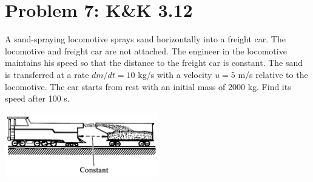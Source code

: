 \documentclass[problems]{esg8012pset}
\begin{document}
\section*{Problem 7: K\&K 3.12}
  A sand-spraying locomotive sprays sand horizontally into a freight car. The locomotive and freight car are not attached. The engineer in the locomotive maintains his speed so that the distance to the freight car is constant. The sand is transferred at a rate $d m / d t = 10$ kg/s with a velocity $u = 5$ m/s relative to the locomotive. The car starts from rest with an initial mass of 2000 kg. Find its speed after 100 s.
  \begin{center}\includegraphics[width=0.5\textwidth]{ps_04_3}\end{center}
\end{document}
